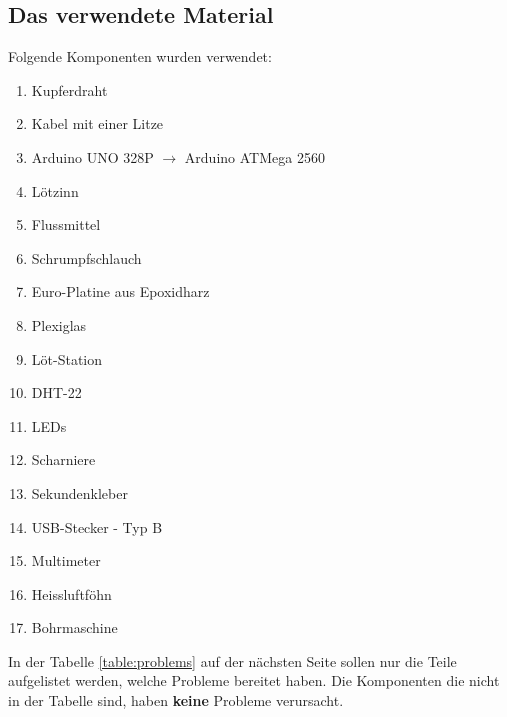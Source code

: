 \documentclass{article}
\begin{document}
\subsection{Das verwendete Material} 
Folgende Komponenten wurden verwendet: 
\begin{enumerate}
\item Kupferdraht
\item Kabel mit einer Litze
\item Arduino UNO 328P $\rightarrow$ Arduino ATMega 2560
\item Lötzinn
\item Flussmittel
\item Schrumpfschlauch
\item Euro-Platine aus Epoxidharz
\item Plexiglas
\item Löt-Station
\item DHT-22
\item LEDs
\item Scharniere
\item Sekundenkleber
\item USB-Stecker - Typ B
\item Multimeter
\item Heissluftföhn
\item Bohrmaschine
\end{enumerate}
In der Tabelle \ref{table:problems} auf der nächsten Seite sollen nur die Teile aufgelistet werden, welche Probleme bereitet haben. Die Komponenten die nicht in der Tabelle sind, haben \textbf{keine} Probleme verursacht.
\end{document}
